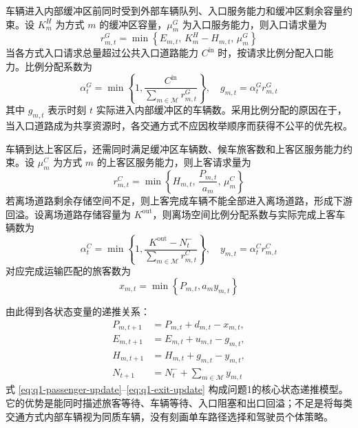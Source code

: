 \documentclass[UTF8,a4paper,11pt,onecolumn,fontset=none]{ctexart}
\begin{document}
车辆进入内部缓冲区前同时受到外部车辆队列、入口服务能力和缓冲区剩余容量约束。设 $K_m^H$ 为方式 $m$ 的缓冲区容量，$\mu_m^G$ 为入口服务能力，则入口请求量为
\begin{equation}
  r_{m,t}^{G}=\min\left\{E_{m,t},\,K_m^H-H_{m,t},\,\mu_m^G\right\}
  \label{eq:q1-gate-request}
\end{equation}
当各方式入口请求总量超过公共入口道路能力 $C^{\mathrm{in}}$ 时，按请求比例分配入口能力。比例分配系数为
\begin{equation}
  \alpha_t^G=\min\left\{1,\frac{C^{\mathrm{in}}}{\sum_{m\in\mathcal M}r_{m,t}^{G}}\right\},
  \quad
  g_{m,t}=\alpha_t^G r_{m,t}^{G}
  \label{eq:q1-gate-allocation}
\end{equation}
其中 $g_{m,t}$ 表示时刻 $t$ 实际进入内部缓冲区的车辆数。采用比例分配的原因在于，当入口道路成为共享资源时，各交通方式不应因枚举顺序而获得不公平的优先权。

车辆到达上客区后，还需同时满足缓冲区车辆数、候车旅客数和上客区服务能力约束。设 $\mu_m^C$ 为方式 $m$ 的上客区服务能力，则上客请求量为
\begin{equation}
  r_{m,t}^{C}=\min\left\{H_{m,t},\,\frac{P_{m,t}}{a_m},\,\mu_m^C\right\}
  \label{eq:q1-curb-request}
\end{equation}
若离场道路剩余存储空间不足，则上客完成车辆不能全部进入离场道路，形成下游回溢。设离场道路存储容量为 $K^{\mathrm{out}}$，则离场空间比例分配系数与实际完成上客车辆数为
\begin{equation}
  \alpha_t^C=\min\left\{1,\frac{K^{\mathrm{out}}-N_t^{-}}{\sum_{m\in\mathcal M}r_{m,t}^{C}}\right\},
  \quad
  y_{m,t}=\alpha_t^C r_{m,t}^{C}
  \label{eq:q1-curb-allocation}
\end{equation}
对应完成运输匹配的旅客数为
\begin{equation}
  x_{m,t}=\min\left\{P_{m,t},a_my_{m,t}\right\}
  \label{eq:q1-served-passenger}
\end{equation}

由此得到各状态变量的递推关系：
\begin{align}
  P_{m,t+1}&=P_{m,t}+d_{m,t}-x_{m,t}, \label{eq:q1-passenger-update}\\
  E_{m,t+1}&=E_{m,t}+u_{m,t}-g_{m,t}, \label{eq:q1-external-update}\\
  H_{m,t+1}&=H_{m,t}+g_{m,t}-y_{m,t}, \label{eq:q1-stage-update}\\
  N_{t+1}&=N_t^{-}+\sum_{m\in\mathcal M}y_{m,t} \label{eq:q1-exit-update}
\end{align}
式 \eqref{eq:q1-passenger-update}--\eqref{eq:q1-exit-update} 构成问题1的核心状态递推模型。它的优势是能同时描述旅客等待、车辆等待、入口阻塞和出口回溢；不足是将每类交通方式内部车辆视为同质车辆，没有刻画单车路径选择和驾驶员个体策略。
\end{document}
